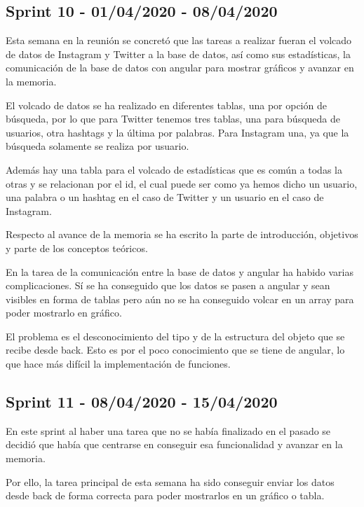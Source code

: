 
\subsection{Sprint 10 - 01/04/2020 - 08/04/2020}
Esta semana en la reunión se concretó que las tareas a realizar fueran el volcado de datos de Instagram y Twitter a la base de datos, así como sus estadísticas, la comunicación de la base de datos con angular para mostrar gráficos y avanzar en la memoria.

El volcado de datos se ha realizado en diferentes tablas, una por opción de búsqueda, por lo que para Twitter tenemos tres tablas, una para búsqueda de usuarios, otra hashtags y la última por palabras. Para Instagram una, ya que la búsqueda solamente se realiza por usuario.

Además hay una tabla para el volcado de estadísticas que es común a todas la otras y se relacionan por el id, el cual puede ser como ya hemos dicho un usuario, una palabra o un hashtag en el caso de Twitter y un usuario en el caso de Instagram.

Respecto al avance de la memoria se ha escrito la parte de introducción, objetivos y parte de los conceptos teóricos.

En la tarea de la comunicación entre la base de datos y angular ha habido varias complicaciones.
Sí se ha conseguido que los datos se pasen a angular y sean visibles en forma de tablas pero aún no se ha conseguido volcar en un array para poder mostrarlo en gráfico.

El problema es el desconocimiento del tipo y de la estructura del objeto que se recibe desde back. Esto es por el poco conocimiento que se tiene de angular, lo que hace más difícil la implementación de funciones.


\subsection{Sprint 11 - 08/04/2020 - 15/04/2020}
En este sprint al haber una tarea que no se había finalizado en el pasado se decidió que había que centrarse en conseguir esa funcionalidad y avanzar en la memoria.

Por ello, la tarea principal de esta semana ha sido conseguir enviar los datos desde back de forma correcta para poder mostrarlos en un gráfico o tabla.


